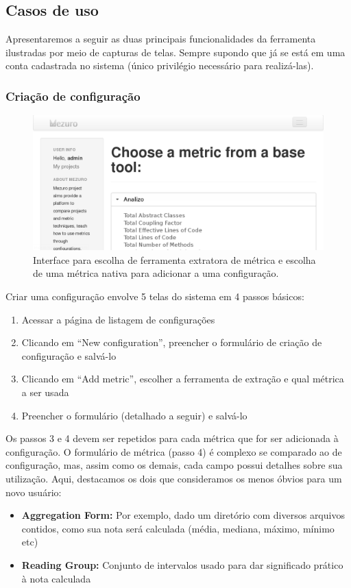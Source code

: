 \documentclass[12pt]{article}
\begin{document}
  \subsection{Casos de uso}
  Apresentaremos a seguir as duas principais funcionalidades da ferramenta ilustradas por meio de capturas de telas. Sempre supondo que já se está em uma conta cadastrada no sistema (único privilégio necessário para realizá-las).
    \subsubsection{Criação de configuração}
    \begin{figure}[H]
      \centering
      \includegraphics[scale=0.30]{images/choose-metric.png}
      \caption{Interface para escolha de ferramenta extratora de métrica e escolha de uma métrica nativa para adicionar a uma configuração.}
      \label{fig:choose-metric}
    \end{figure}
    Criar uma configuração envolve 5 telas do sistema em 4 passos básicos:
    \begin{enumerate}
      \item Acessar a página de listagem de configurações
      \item Clicando em ``New configuration'', preencher o formulário de criação de configuração e salvá-lo
      \item Clicando em ``Add metric'', escolher a ferramenta de extração e qual métrica a ser usada
      \item Preencher o formulário (detalhado a seguir) e salvá-lo
    \end{enumerate}
    Os passos 3 e 4 devem ser repetidos para cada métrica que for ser adicionada à configuração. O formulário de métrica (passo 4) é complexo se comparado ao de configuração, mas, assim como os demais, cada campo possui detalhes sobre sua utilização. Aqui, destacamos os dois que consideramos os menos óbvios para um novo usuário:
    \begin{itemize}
      \item \textbf{Aggregation Form:} Por exemplo, dado um diretório com diversos arquivos contidos, como sua nota será calculada (média, mediana, máximo, mínimo etc)
      \item \textbf{Reading Group:} Conjunto de intervalos usado para dar significado prático à nota calculada
    \end{itemize}
\end{document}
